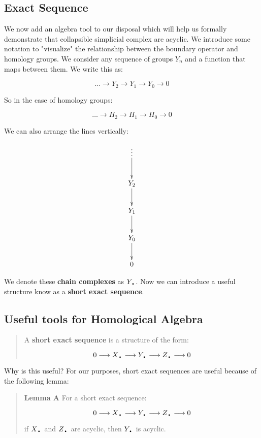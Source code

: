 \documentclass[letterpaper,12pt]{article}
\newcommand{\lra}{\longrightarrow}
\newcommand{\tb}{\text{\textbullet}}
\begin{document}
\subsection{Exact Sequence}

We now add an algebra tool to our disposal which will help us formally demonstrate that collapsible simplicial complex are acyclic. We introduce some notation to "visualize" the relationship between the boundary operator and homology groups. We consider any sequence of groups $Y_n$ and a function that maps between them. We write this as:

$$\ldots \longrightarrow Y_2 \rightarrow Y_1 \rightarrow Y_0 \rightarrow 0 $$

So in the case of homology groups:

$$\ldots \rightarrow H_2 \rightarrow H_1 \rightarrow H_0 \rightarrow 0 $$

We can also arrange the lines vertically:

\begin{displaymath}
    \xymatrix{\vdots \ar[d] \\ Y_2 \ar[d] \\ Y_1 \ar[d] \\ Y_0 \ar[d] \\ 0 }
\end{displaymath}

We denote these \textbf{chain complexes} as $Y_{\tb}$. Now we can introduce a useful structure know as a \textbf{short exact sequence}.

\subsection{Useful tools for Homological Algebra}

\begin{quote}
    A \textbf{short exact sequence} is a structure of the form:

    $$0 \lra X_{\tb} \lra Y_{\tb} \lra Z_{\tb} \lra 0 $$

\end{quote}

Why is this useful? For our purposes, short exact sequences are useful because of the following lemma:

\begin{quote}
    \textbf{Lemma A} For a short exact sequence:

    $$0 \lra X_{\tb} \lra Y_{\tb} \lra Z_{\tb} \lra 0 $$

    if $X_{\tb}$ and $Z_{\tb}$ are acyclic, then $Y_{\tb}$ is acyclic.
\end{quote}
\end{document}
